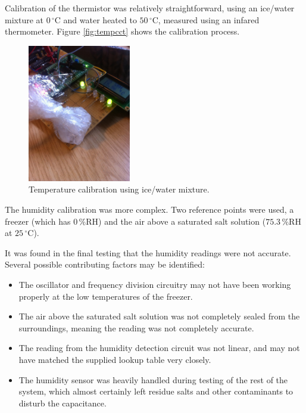 \documentclass[a4paper,10pt]{article}  %
\providecommand{\degrees}{\ensuremath{^{\circ}}}
\begin{document}
Calibration of the thermistor was relatively straightforward, using an
ice/water mixture at $0\,\mathrm{\degrees C}$ and water heated to
$50\,\mathrm{\degrees C}$, measured using an infared
thermometer. Figure \ref{fig:tempcct} shows the calibration process.
\begin{figure}[!htb]
  \begin{center}
    \includegraphics[width=0.4\textwidth]{themistor_calib.jpg}
  \end{center}
  \caption{Temperature calibration using ice/water mixture.}
  \label{fig:calibice}
\end{figure}

The humidity calibration was more complex. Two reference points were
used, a freezer (which has $0\,\mathrm{\% RH}$) and the air above a
saturated salt solution ($75.3\,\mathrm{\% RH}$ at $25\,
  \mathrm{\degrees C}$).

It was found in the final testing that the humidity readings were not
accurate. Several possible contributing factors may be identified:
\begin{itemize}
\item The oscillator and frequency division circuitry may not have
  been working properly at the low temperatures of the freezer.
  \item The air above the saturated salt solution was not completely
    sealed from the surroundings, meaning the reading was not
    completely accurate.
  \item The reading from the humidity detection circuit was not
    linear, and may not have matched the supplied lookup table very closely.
  \item The humidity sensor was heavily handled during testing of the
    rest of the system, which almost certainly left residue salts and
    other contaminants to disturb the capacitance.
\end{itemize}
\end{document}
